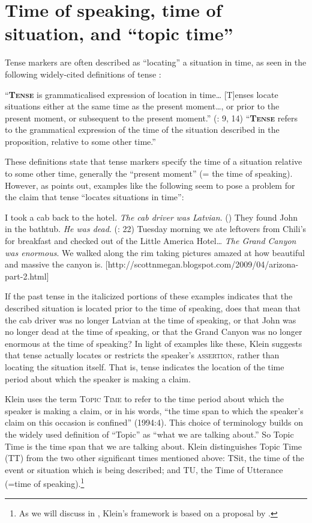 \section{Time of speaking, time of situation, and “topic time”}\label{sec:20.3}

Tense markers are often described as “locating” a situation in time, as seen in the following widely-cited definitions of tense :


\ea \label{ex:20.10}
\ea   “\textbf{\textsc{Tense}} is grammaticalised expression of location in time… [T]enses locate situations either at the same time as the present moment…, or prior to the present moment, or subsequent to the present moment.” (\citealt{Comrie1985}: 9, 14)
\ex  “\textbf{\textsc{Tense}} refers to the grammatical expression of the time of the situation described in the proposition, relative to some other time.” \citep{Bybee1985}
\z \z


These definitions state that tense markers specify the time of a situation relative to some other time, generally the “present moment” (= the time of speaking). However, as \citet{Klein1994} points out, examples like the following seem to pose a problem for the claim that tense “locates situations in time”:


\ea \label{ex:20.11}
\ea   I took a cab back to the hotel. \textit{The cab driver was Latvian}. (\citealt{Michaelis2006})
\ex They found John in the bathtub. \textit{He was dead}.  (\citealt{Klein1994}: 22)
\ex  Tuesday morning we ate leftovers from Chili’s for breakfast and checked out of the Little America Hotel… \textit{The Grand Canyon was enormous}. We walked along the rim taking pictures amazed at how beautiful and massive the canyon is. [http://scottnmegan.blogspot.com/2009/04/arizona-part-2.html]
\z \z


If the past tense in the italicized portions of these examples indicates that the described situation is located prior to the time of speaking, does that mean that the cab driver was no longer Latvian at the time of speaking, or that John was no longer dead at the time of speaking, or that the Grand Canyon was no longer enormous at the time of speaking? In light of examples like these, Klein suggests that tense actually locates or restricts the speaker’s \textsc{assertion}, rather than locating the situation itself. That is, tense indicates the location of the time period about which the speaker is making a claim.



Klein uses the term \textsc{Topic Time} to refer to the time period about which the speaker is making a claim, or in his words, “the time span to which the speaker’s claim on this occasion is confined” (1994:4). This choice of terminology builds on the widely used definition of “Topic” as “what we are talking about.” So Topic Time is the time span that we are talking about. Klein distinguishes Topic Time (TT) from the two other significant times mentioned above: TSit, the time of the event or situation which is being described; and TU, the Time of Utterance (=time of speaking).\footnote{As we will discuss in , Klein’s framework is based on a proposal by \citet[§51]{Reichenbach1947}.}



